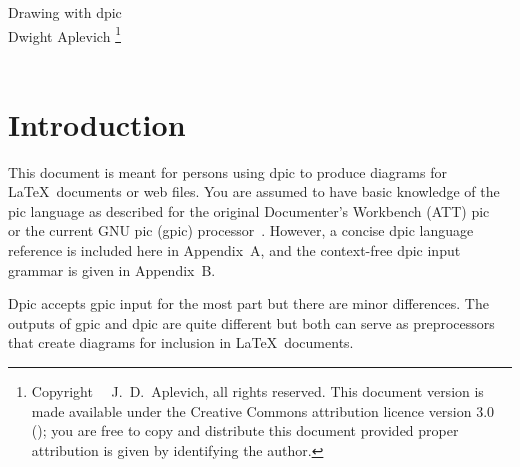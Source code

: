 \documentclass[11pt]{article}
\newcommand{\bq}{}
\newcommand{\Dpic}{{\bq Dpic}\xspace}
\begin{document}
%
\begin{centering}
{\LARGE Drawing with dpic}\\
{\large
Dwight Aplevich%
\footnote{Copyright \textcopyright\ \the\year\ J.\ D.\ Aplevich,
  all rights reserved.  This document version is made available
  under the Creative Commons attribution licence version 3.0
  ();
  you are free to copy
  and distribute this document provided proper attribution is given by
  identifying the author.
  }\\
}\\
\end{centering}

%
\begin{multicols}{2}
\tableofcontents
\end{multicols}
\section{Introduction}

This document is meant for persons using dpic to produce diagrams for
\LaTeX\ documents or web files.  You are assumed to have basic knowledge
of the pic language as described for the original Documenter's
Workbench (ATT) pic~\cite{KRpic} or the
current GNU pic (gpic) processor~\cite{Raymond95}.
However, a concise dpic language reference is included here in
Appendix~A, and the context-free dpic input grammar is given in Appendix~B.

\Dpic accepts gpic input for the most part but
there are minor differences.  The outputs of gpic and dpic are quite
different but both can serve as preprocessors that create diagrams for
inclusion in \LaTeX\ documents.
\end{document}
